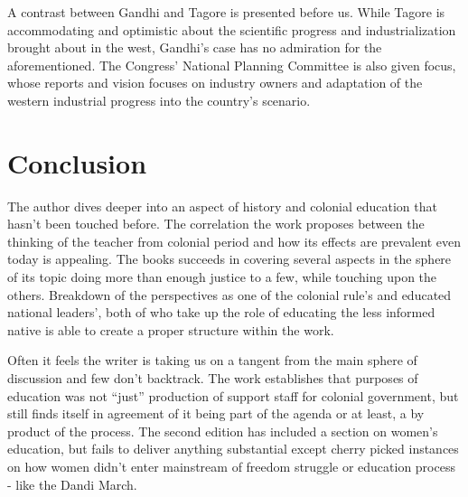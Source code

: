 \documentclass[a4paper,twocolumn]{article}
\begin{document}
    A contrast between Gandhi and Tagore is presented
    before us. While Tagore is accommodating and
    optimistic about the scientific progress and
    industrialization brought about in the west,
    Gandhi's case has no admiration for the
    aforementioned. The Congress' National Planning
    Committee is also given focus, whose reports and
    vision focuses on industry owners and adaptation of
    the western industrial progress into the country's
    scenario. 


\section{Conclusion}
    The author dives deeper into an aspect of history
    and colonial education that hasn't been touched
    before. The correlation the work proposes between
    the thinking of the teacher from colonial period and
    how its effects are prevalent even today is
    appealing. The books succeeds in covering several
    aspects in the sphere of its topic doing more than
    enough justice to a few, while touching upon the
    others. Breakdown of the perspectives as one of
    the colonial rule's and educated national leaders',
    both of who take up the role of educating the less
    informed native is able to create a proper structure
    within the work.
    
    Often it feels the writer is taking us on a tangent
    from the main sphere of discussion and few don't
    backtrack. The work establishes that purposes of
    education was not ``just'' production of support
    staff for colonial government, but still finds
    itself in agreement of it being part of the agenda
    or at least, a by product of the process. The second
    edition has included a section on women's education,
    but fails to deliver anything substantial except
    cherry picked instances on how women didn't enter
    mainstream of freedom struggle or education process
    - like the Dandi March. 

\printbibliography 
\end{document}
